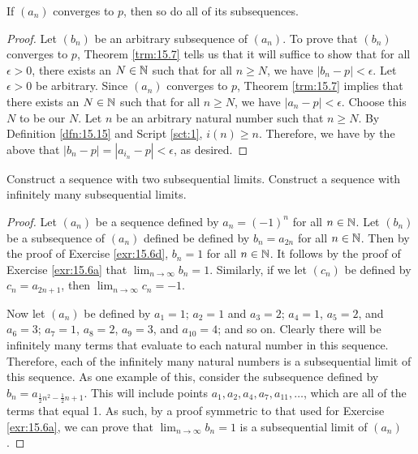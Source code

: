 \documentclass[../main.tex]{subfiles}
\begin{document}
\begin{theorem}\label{trm:15.16}
    If $(a_n)$ converges to $p$, then so do all of its subsequences.
    \begin{proof}
        Let $(b_n)$ be an arbitrary subsequence of $(a_n)$. To prove that $(b_n)$ converges to $p$, Theorem \ref{trm:15.7} tells us that it will suffice to show that for all $\epsilon>0$, there exists an $N\in\mathbb{N}$ such that for all $n\geq N$, we have $|b_n-p|<\epsilon$. Let $\epsilon>0$ be arbitrary. Since $(a_n)$ converges to $p$, Theorem \ref{trm:15.7} implies that there exists an $N\in\mathbb{N}$ such that for all $n\geq N$, we have $|a_n-p|<\epsilon$. Choose this $N$ to be our $N$. Let $n$ be an arbitrary natural number such that $n\geq N$. By Definition \ref{dfn:15.15} and Script \ref{sct:1}, $i(n)\geq n$. Therefore, we have by the above that $|b_n-p|=|a_{i_n}-p|<\epsilon$, as desired.
    \end{proof}
\end{theorem}

\begin{exercise}\label{exr:15.17}
    Construct a sequence with two subsequential limits. Construct a sequence with infinitely many subsequential limits.
    \begin{proof}
        Let $(a_n)$ be a sequence defined by $a_n=(-1)^n$ for all $n\in\mathbb{N}$. Let $(b_n)$ be a subsequence of $(a_n)$ defined be defined by $b_n=a_{2n}$ for all $n\in\mathbb{N}$. Then by the proof of Exercise \ref{exr:15.6d}, $b_n=1$ for all $n\in\mathbb{N}$. It follows by the proof of Exercise \ref{exr:15.6a} that $\lim_{n\to\infty}b_n=1$. Similarly, if we let $(c_n)$ be defined by $c_n=a_{2n+1}$, then $\lim_{n\to\infty}c_n=-1$.\par
        Now let $(a_n)$ be defined by $a_1=1$; $a_2=1$ and $a_3=2$; $a_4=1$, $a_5=2$, and $a_6=3$; $a_7=1$, $a_8=2$, $a_9=3$, and $a_{10}=4$; and so on. Clearly there will be infinitely many terms that evaluate to each natural number in this sequence. Therefore, each of the infinitely many natural numbers is a subsequential limit of this sequence. As one example of this, consider the subsequence defined by $b_n=a_{\frac{1}{2}n^2-\frac{1}{2}n+1}$. This will include points $a_1,a_2,a_4,a_7,a_{11},\dots$, which are all of the terms that equal 1. As such, by a proof symmetric to that used for Exercise \ref{exr:15.6a}, we can prove that $\lim_{n\to\infty}b_n=1$ is a subsequential limit of $(a_n)$.
    \end{proof}
\end{exercise}
\end{document}
